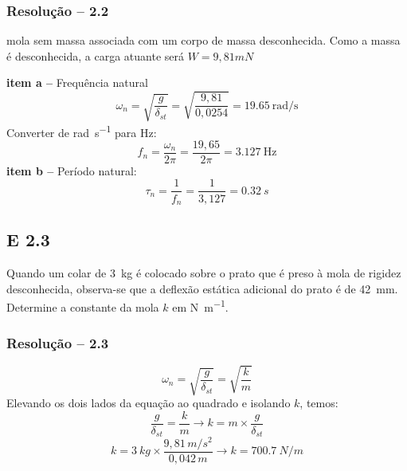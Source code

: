 \subsubsection{Resolução -- 2.2}
mola sem massa associada com um corpo de massa desconhecida.
Como a massa é desconhecida, a carga atuante será $W=9,81m\si{N}$

\textbf{item a --} Frequência natural
\[
\omega_{n}=\sqrt{\frac{g}{\delta_{st}}} =
\sqrt{\frac{9,81}{0,0254}}=\SI{19,65}{\radian\per\second}
\]
Converter de \si{\radian\per\second} para \si{\hertz}:
\[
f_{n}=\frac{\omega_{n}}{2\pi}=\frac{19,65}{2\pi}=\SI{3,127}{\hertz}
\]
\textbf{item b --} Período natural:
\[
\tau_{n}=\frac{1}{f_{n}} = \frac{1}{3,127}=\SI{0,32}{s}
\]
\subsection{E 2.3}%

Quando um colar de \SI{3}{kg} é colocado sobre o
prato que é preso à mola de rigidez desconhecida,
observa-se que a deflexão estática adicional do prato
é de \SI{42}{mm}. Determine a constante da mola $k$ em \si{N\per\meter}.

\subsubsection{Resolução -- 2.3}

\[
\omega_{n}=\sqrt{\frac{g}{\delta_{st}}} = \sqrt{\frac{k}{m}}
\]
Elevando os dois lados da equação ao quadrado e isolando $k$, temos:
\[
\frac{g}{\delta_{st}}=\frac{k}{m} \to k=m\times \frac{g}{\delta_{st}}
\]
\[
    k = \SI{3}{kg}\times \frac{9,81\,\si{m /s^2}}{0,042\,\si{m}} \to k =
    \SI{700,7}{N /m}
\]
